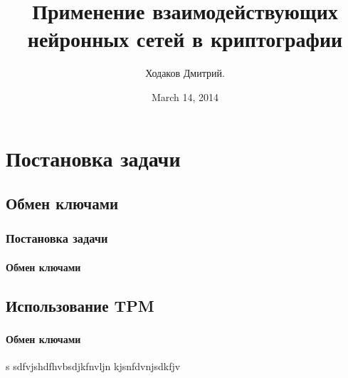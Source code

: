\documentclass{beamer}
\title{Применение взаимодействующих нейронных сетей в криптографии}
\author{Ходаков Дмитрий.}
\date{March 14, 2014} %
\begin{document}
\frame{\titlepage}
\frame{\tableofcontents}
\section{Постановка задачи}
\subsection{Обмен ключами}
\frame
{
\frametitle{Постановка задачи}
\framesubtitle{Обмен ключами}
}
\subsection{Использование TPM}
\frame
{
\frametitle{}
\framesubtitle{Обмен ключами}s
sdfvjshdfhvbsdjkfnvljn
kjsnfdvnjsdkfjv
}
\end{document}
